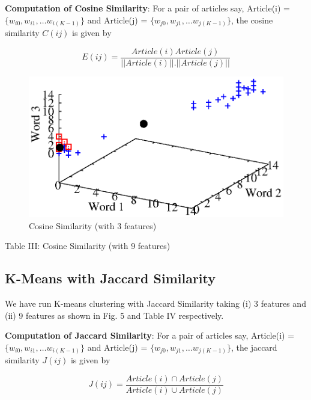 \documentclass[journal,onecolumn]{IEEEtran}
\begin{document}
{\textbf{Computation of Cosine Similarity}: For a pair of articles say, Article(i) = $\{w_{i0}, w_{i1}, \dots w_{i(K-1)} \}$ and Article(j) = $\{w_{j0}, w_{j1}, \dots w_{j(K-1)} \}$, the cosine similarity $C(ij)$ is given by

\begin{equation} \label{cosine_sim_eq}
E(ij) = \frac{Article(i) Article(j)}{||Article(i)|| . ||Article(j)||}
\end{equation}

\begin{figure}[h] \label{cosine_sim}
\begin{center}
 \includegraphics[scale=.70] {Plots/cosine_sim.eps}
 \caption { Cosine Similarity (with 3 features)}
 \end{center}
\end{figure}

{Table III: Cosine Similarity (with 9 features) \label{cosine_sim_10}}

\subsection{K-Means with Jaccard Similarity}
We have run K-means clustering with Jaccard Similarity taking (i) 3 features and (ii) 9 features as shown in Fig. 5 and Table IV respectively.

\textbf{Computation of Jaccard Similarity}: For a pair of articles say, Article(i) = $\{w_{i0}, w_{i1}, \dots w_{i(K-1)} \}$ and Article(j) = $\{w_{j0}, w_{j1}, \dots w_{j(K-1)} \}$, the jaccard similarity $J(ij)$ is given by

\begin{equation} \label{jaccard}
J(ij) = \frac{Article(i) \cap Article(j)}{Article(i) \cup Article(j)}
\end{equation}


}
\end{document}

